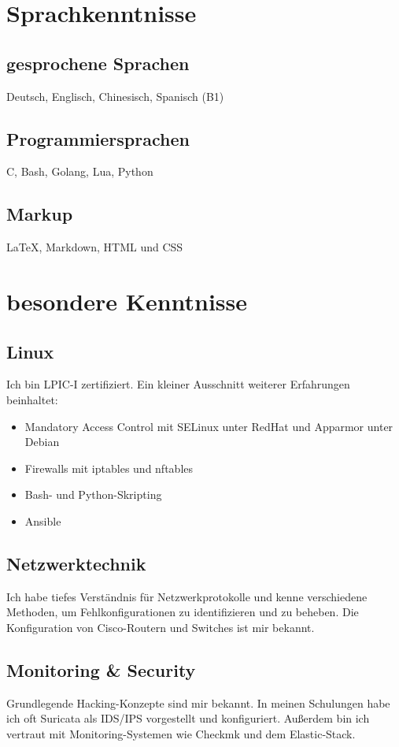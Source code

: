 \documentclass{article}
\begin{document}
\section{Sprachkenntnisse}

\subsection{gesprochene Sprachen}
Deutsch, Englisch, Chinesisch, Spanisch (B1)

\subsection{Programmiersprachen}
C, Bash, Golang, Lua, Python

\subsection{Markup}
\LaTeX, Markdown, HTML und CSS

\section{besondere Kenntnisse}

\subsection{Linux}
Ich bin LPIC-I zertifiziert.
Ein kleiner Ausschnitt weiterer Erfahrungen beinhaltet:
\begin{itemize}
\item{Mandatory Access Control mit SELinux unter RedHat und Apparmor unter Debian}
\item{Firewalls mit iptables und nftables}
\item{Bash- und Python-Skripting}
\item{Ansible}
\end{itemize}

\subsection{Netzwerktechnik}
Ich habe tiefes Verständnis für Netzwerkprotokolle und kenne verschiedene Methoden, um Fehlkonfigurationen zu identifizieren und zu beheben.
Die Konfiguration von Cisco-Routern und Switches ist mir bekannt.

\subsection{Monitoring \& Security}
Grundlegende Hacking-Konzepte sind mir bekannt.
In meinen Schulungen habe ich oft Suricata als IDS/IPS vorgestellt und konfiguriert.
Außerdem bin ich vertraut mit Monitoring-Systemen wie Checkmk und dem Elastic-Stack.
\end{document}
